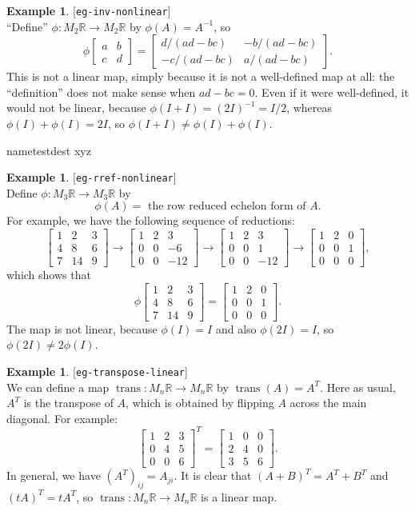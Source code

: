 \documentclass{amsart}
\newcommand{\lbl}[1]{\label{#1}\textup{[\texttt{#1}]}\ \\}
\newcommand{\lbl}{\label}
\newcommand{\R}         {{\mathbb{R}}}
\newcommand{\trans}     {\operatorname{trans}}
\newcommand{\bsm}       {\left[\begin{smallmatrix}}
\newcommand{\esm}       {\end{smallmatrix}\right]}
\newcommand{\xra}       {\xrightarrow}
\renewcommand{\:}       {\colon}
\theoremstyle{definition}
\newtheorem{example}[theorem]{Example}
\begin{document}
\begin{example}\lbl{eg-inv-nonlinear}
 ``Define'' $\phi\:M_2\R\xra{}M_2\R$ by $\phi(A)=A^{-1}$, so
 \[ \phi\bsm a & b \\ c & d\esm =
     \bsm d/(ad-bc) & -b/(ad-bc) \\ -c/(ad-bc) & a/(ad-bc) \esm. 
 \]
 This is not a linear map, simply because it is not a
 well-defined map at all: the ``definition'' does not make
 sense when $ad-bc=0$.  Even if it were well-defined, it
 would not be linear, because $\phi(I+I)=(2I)^{-1}=I/2$,
 whereas $\phi(I)+\phi(I)=2I$, so
 $\phi(I+I)\neq\phi(I)+\phi(I)$.
\end{example}

\pdfdest name{testdest} xyz

\begin{example}\lbl{eg-rref-nonlinear}
 Define $\phi\:M_3\R\xra{}M_3\R$ by 
 \[ \phi(A)=\text{ the row reduced echelon form of } A. \]
 For example, we have the following sequence of reductions:
 \[ \bsm 1&2&3 \\ 4&8&6 \\ 7&14&9 \esm \to
    \bsm 1&2&3 \\ 0&0&-6 \\ 0&0&-12 \esm \to
    \bsm 1&2&3 \\ 0&0&1 \\ 0&0&-12 \esm \to
    \bsm 1&2&0 \\ 0&0&1 \\ 0&0&0 \esm,
 \]
 which shows that
 \[ \phi\bsm 1&2&3 \\ 4&8&6 \\ 7&14&9 \esm  = 
    \bsm 1&2&0 \\ 0&0&1 \\ 0&0&0 \esm.
 \]
 The map is not linear, because $\phi(I)=I$ and also
 $\phi(2I)=I$, so $\phi(2I)\neq 2\phi(I)$.
\end{example}

\begin{example}\lbl{eg-transpose-linear}
 We can define a map $\trans\:M_n\R\xra{}M_n\R$ by $\trans(A)=A^T$.
 Here as usual, $A^T$ is the transpose of $A$, which is obtained by
 flipping $A$ across the main diagonal.  For example:
 \[ \bsm 1 & 2 & 3 \\ 0 & 4 & 5 \\ 0 & 0 & 6 \esm^T =
    \bsm 1 & 0 & 0 \\ 2 & 4 & 0 \\ 3 & 5 & 6 \esm.
 \]
 In general, we have $(A^T)_{ij}=A_{ji}$.  It is clear that 
 $(A+B)^T=A^T+B^T$ and $(tA)^T=tA^T$, so $\trans\:M_n\R\xra{}M_n\R$
 is a linear map.
\end{example}
\end{document}
